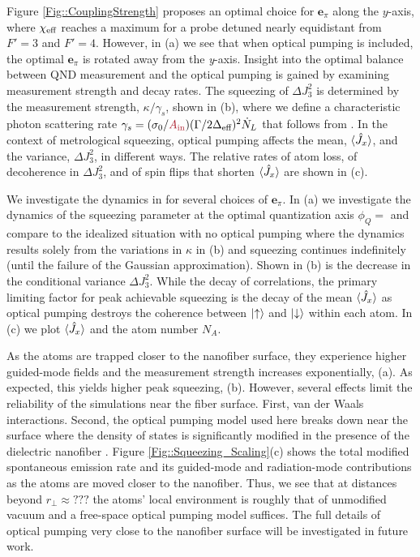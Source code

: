 \documentclass[preprint,aps,pra,onecolumn]{revtex4-1} %
\newcommand{\qaxis}{\mathbf{e}_\pi}
\newcommand{\varz}{\Delta J_3^2}
\newcommand{\comment}[1]{{\color{Maroon} #1}}
\begin{document}
Figure \ref{Fig::CouplingStrength} proposes an optimal choice for $\qaxis$ along the $y$-axis, where $\chi_{\text{eff}}$ reaches a maximum for a probe detuned nearly equidistant from $F'=3$ and $F'=4$. 
However, in (a) we see that when optical pumping is included, the optimal $\qaxis$ is rotated away from the \emph{y}-axis. 
Insight into the optimal balance between QND measurement and the optical pumping is gained by examining measurement strength and decay rates. 
The squeezing of $\varz$ is determined by the measurement strength, $\kappa/\gamma_s$, shown in (b), where we define a characteristic photon scattering rate $\gamma_s = (\sigma_0/\comment{A_{\rm in}})(\Gamma/2 \Delta_\eff)^2 \dot{N}_L$ that follows from . 
In the context of metrological squeezing, optical pumping affects the mean, $\langle{\hat{J}_x}\rangle$, and the variance, $\varz$, in different ways. 
The relative rates of atom loss, of decoherence in $\varz$, and of spin flips that shorten $\langle{\hat{J}_x}\rangle$ are shown in (c). 

We investigate the dynamics in  for several choices of $\qaxis$. 
In (a) we investigate the dynamics of the squeezing parameter at the optimal quantization axis $\phi_Q=$ and compare to the idealized situation with no optical pumping where the dynamics results solely from the variations in $\kappa$ in (b) and squeezing continues indefinitely (until the failure of the Gaussian approximation). Shown in (b) is the decrease in the conditional variance $\varz$. While the decay of correlations, the primary limiting factor for peak achievable squeezing is the decay of the mean $\langle{\hat{J}_x}\rangle$ as optical pumping destroys the coherence between $\lvert{\uparrow}\rangle$ and $\lvert{\downarrow}\rangle$ within each atom. 
In (c) we plot $\langle{\hat{J}_x}\rangle$ and the atom number $N_A$.  



As the atoms are trapped closer to the nanofiber surface, they experience higher guided-mode fields and the measurement strength increases exponentially, (a). 
As expected, this yields higher peak squeezing, (b). However, several effects limit the reliability of the simulations near the fiber surface. 
First, van der Waals interactions.  
Second, the optical pumping model used here breaks down near the surface where the density of states is significantly modified in the presence of the dielectric nanofiber \cite{}. 
Figure \ref{Fig::Squeezing_Scaling}(c) shows the total modified spontaneous emission rate and its guided-mode and radiation-mode contributions as the atoms are moved closer to the nanofiber. 
Thus, we see that at distances beyond $r_\perp \approx ???$ the atoms' local environment is roughly that of unmodified vacuum and a free-space optical pumping model suffices. 
The full details of optical pumping very close to the nanofiber surface will be investigated in future work.
\end{document}
